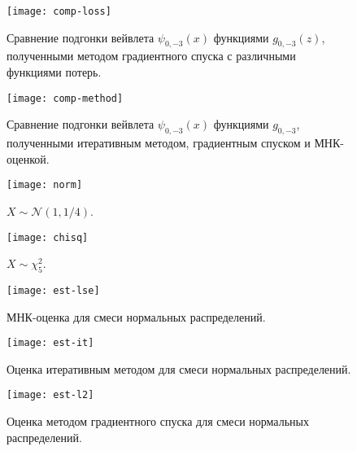 \documentclass[../paper.tex]{subfiles}
\begin{document}
\begin{figure}[h]
	\begin{minipage}{0.48\textwidth}
		\centering
		\texttt{[image: comp-loss]}
		\caption{Сравнение подгонки вейвлета $\psi_{0,-3}(x)$ функциями $g_{0,-3}(z)$, полученными методом градиентного спуска с различными функциями потерь.}
		\label{comp-loss}
	\end{minipage}\hfill
	\begin{minipage}{0.48\textwidth}
		\centering
		\texttt{[image: comp-method]}
		\caption{Сравнение подгонки вейвлета $\psi_{0,-3}(x)$ функциями $g_{0,-3}$, полученными итеративным методом, градиентным спуском и МНК-оценкой.}
		\label{comp-method}
	\end{minipage}\hfill
\end{figure}

\begin{figure}[h]
	\begin{minipage}{0.48\textwidth}
		\centering
		\texttt{[image: norm]}
		\caption{$X \sim \mathcal{N}(1, 1/4)$.}
		\label{norm}
	\end{minipage}\hfill
	\begin{minipage}{0.48\textwidth}
		\centering
		\texttt{[image: chisq]}
		\caption{$X \sim \chi^2_5$.}
		\label{chisq}
	\end{minipage}\hfill
\end{figure}

\begin{figure}[h]
	\begin{minipage}{0.48\textwidth}
		\centering
		\texttt{[image: est-lse]}
		\caption{МНК-оценка для смеси нормальных распределений.}
		\label{est-lse}
	\end{minipage}\hfill
	\begin{minipage}{0.48\textwidth}
		\centering
		\texttt{[image: est-it]}
		\caption{Оценка итеративным методом для смеси нормальных распределений.}
		\label{est-it}
	\end{minipage}\hfill
\end{figure}

\begin{figure}[h]
	\begin{minipage}{0.48\textwidth}
		\centering
		\texttt{[image: est-l2]}
		\caption{Оценка методом градиентного спуска для смеси нормальных распределений.}
		\label{est-l2}
	\end{minipage}\hfill
\end{figure}
\end{document}
